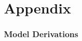 \documentclass[
  11pt,
  letterpaper,
  DIV=11,
  numbers=noendperiod]{scrartcl}
\begin{document}
\newpage

\newpage

\setcounter{section}{0}
\renewcommand{\thesection}{\Alph{section}}
\setcounter{table}{0}
\renewcommand{\thetable}{A\arabic{table}}
\setcounter{figure}{0}
\renewcommand{\thefigure}{A\arabic{figure}}

\section{Appendix}\label{appendix}

\subsubsection{\texorpdfstring{\textbf{Model
Derivations}}{Model Derivations}}\label{model-derivations}
\end{document}
